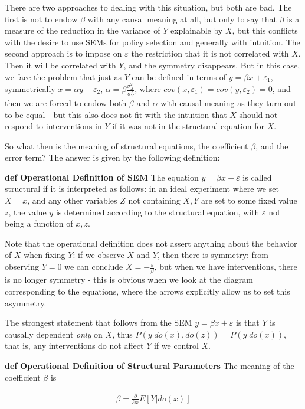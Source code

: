 \documentclass[fleqn]{article}
\def\define#1{\textbf{def} \textbf{#1}}
\numberwithin{equation}{section}
\numberwithin{theorem}{section}
\numberwithin{figure}{section}
\numberwithin{lemma}{section}
\numberwithin{corollary}{section}
\begin{document}
There are two approaches to dealing with this situation, but both are bad. The first is not to endow $\beta$ with any causal meaning at all, but only to say that $\beta$ is a measure of the reduction in the variance of $Y$ explainable by $X$, but this conflicts with the desire to use SEMs for policy selection and generally with intuition. The second approach is to impose on $\varepsilon$ the restriction that it is not correlated with $X$. Then it will be correlated with $Y$, and the symmetry disappears. But in this case, we face the problem that just as $Y$ can be defined in terms of $y = \beta x + \varepsilon_1$, symmetrically $x = \alpha y + \varepsilon_2$, $\alpha = \beta \frac{\sigma_X^2}{\sigma_Y^2}$, where $cov(x, \varepsilon_1) = cov(y, \varepsilon_2) = 0$, and then we are forced to endow both $\beta$ and $\alpha$ with causal meaning as they turn out to be equal - but this also does not fit with the intuition that $X$ should not respond to interventions in $Y$ if it was not in the structural equation for $X$.

So what then is the meaning of structural equations, the coefficient $\beta$, and the error term? The answer is given by the following definition:

\define{Operational Definition of SEM} The equation $y = \beta x + \varepsilon$ is called structural if it is interpreted as follows: in an ideal experiment where we set $X = x$, and any other variables $Z$ not containing $X,Y$ are set to some fixed value $z$, the value $y$ is determined according to the structural equation, with $\varepsilon$ not being a function of $x,z$.

Note that the operational definition does not assert anything about the behavior of $X$ when fixing $Y$: if we observe $X$ and $Y$, then there is symmetry: from observing $Y = 0$ we can conclude $X = -\frac{\varepsilon}{\beta}$, but when we have interventions, there is no longer symmetry - this is obvious when we look at the diagram corresponding to the equations, where the arrows explicitly allow us to set this asymmetry.

The strongest statement that follows from the SEM $y = \beta x + \varepsilon$ is that $Y$ is causally dependent \textit{only} on $X$, thus $P(y|do(x),do(z)) = P(y|do(x))$, that is, any interventions do not affect $Y$ if we control $X$.

\define{Operational Definition of Structural Parameters} The meaning of the coefficient $\beta$ is 

\begin{align}
	\beta = \frac{\partial }{\partial x}E[Y|do(x)]
\end{align}
\end{document}
